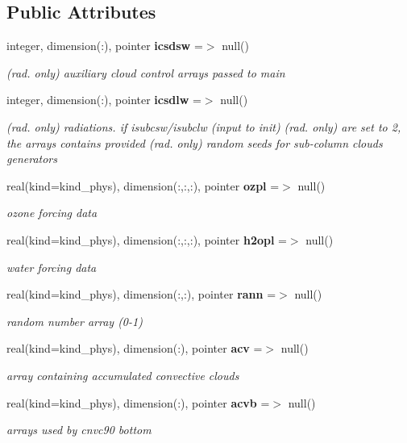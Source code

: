 \subsection*{Public Attributes}
\begin{DoxyCompactItemize}
\item 
integer, dimension(\+:), pointer \textbf{ icsdsw} =$>$ null()
\begin{DoxyCompactList}\small\item\em (rad. only) auxiliary cloud control arrays passed to main \end{DoxyCompactList}\item 
integer, dimension(\+:), pointer \textbf{ icsdlw} =$>$ null()
\begin{DoxyCompactList}\small\item\em (rad. only) radiations. if isubcsw/isubclw (input to init) (rad. only) are set to 2, the arrays contains provided (rad. only) random seeds for sub-\/column clouds generators \end{DoxyCompactList}\item 
real(kind=kind\+\_\+phys), dimension(\+:,\+:,\+:), pointer \textbf{ ozpl} =$>$ null()
\begin{DoxyCompactList}\small\item\em ozone forcing data \end{DoxyCompactList}\item 
real(kind=kind\+\_\+phys), dimension(\+:,\+:,\+:), pointer \textbf{ h2opl} =$>$ null()
\begin{DoxyCompactList}\small\item\em water forcing data \end{DoxyCompactList}\item 
real(kind=kind\+\_\+phys), dimension(\+:,\+:), pointer \textbf{ rann} =$>$ null()
\begin{DoxyCompactList}\small\item\em random number array (0-\/1) \end{DoxyCompactList}\item 
real(kind=kind\+\_\+phys), dimension(\+:), pointer \textbf{ acv} =$>$ null()
\begin{DoxyCompactList}\small\item\em array containing accumulated convective clouds \end{DoxyCompactList}\item 
real(kind=kind\+\_\+phys), dimension(\+:), pointer \textbf{ acvb} =$>$ null()
\begin{DoxyCompactList}\small\item\em arrays used by cnvc90 bottom \end{DoxyCompactList}\item 

\end{DoxyCompactItemize}
